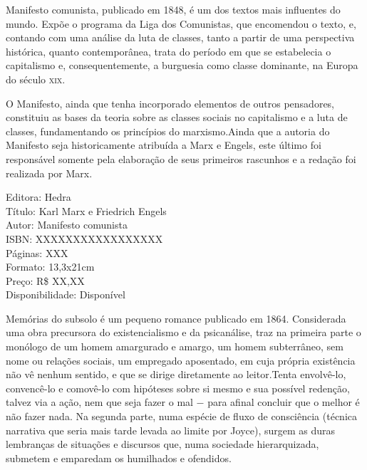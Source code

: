 \pagebreak


\noindent{}Manifesto comunista, publicado em 1848, é um dos textos mais influentes do mundo. Expõe o programa da Liga dos Comunistas, que encomendou o texto, e, contando com uma análise da luta de classes, tanto a partir de uma perspectiva histórica, quanto contemporânea, trata do período em que se estabelecia o capitalismo e, consequentemente, a burguesia como classe dominante, na Europa do século \textsc{xix}.

O Manifesto, ainda que tenha incorporado elementos de outros pensadores, constituiu as bases da teoria sobre as classes sociais no capitalismo e a luta de classes, fundamentando os princípios do marxismo.Ainda que a autoria do Manifesto seja historicamente atribuída a Marx e Engels, este último foi responsável somente pela elaboração de seus primeiros rascunhos e a redação foi realizada por Marx.

\begin{ficha}
Editora: Hedra\\
Título: Karl Marx e Friedrich Engels\\
Autor: Manifesto comunista\\ 
ISBN: XXXXXXXXXXXXXXXXX\\
Páginas: XXX\\
Formato: 13,3x21cm\\
Preço: R\$ XX,XX\\
Disponibilidade: Disponível
\end{ficha}

\pagebreak


\noindent{}Memórias do subsolo é um pequeno romance publicado em 1864. Considerada uma obra precursora do existencialismo e da psicanálise, traz na primeira parte o monólogo de um homem amargurado e amargo, um homem subterrâneo, sem nome ou relações sociais, um empregado aposentado, em cuja própria existência não vê nenhum sentido, e que se dirige diretamente ao leitor.Tenta envolvê-lo, convencê-lo e comovê-lo com hipóteses sobre si mesmo e sua possível redenção, talvez via a ação, nem que seja fazer o mal − para afinal concluir que o melhor é não fazer nada. Na segunda parte, numa espécie de fluxo de consciência (técnica narrativa que seria mais tarde levada ao limite por Joyce), surgem as duras lembranças de situações e discursos que, numa sociedade hierarquizada, submetem e emparedam os humilhados e ofendidos.


